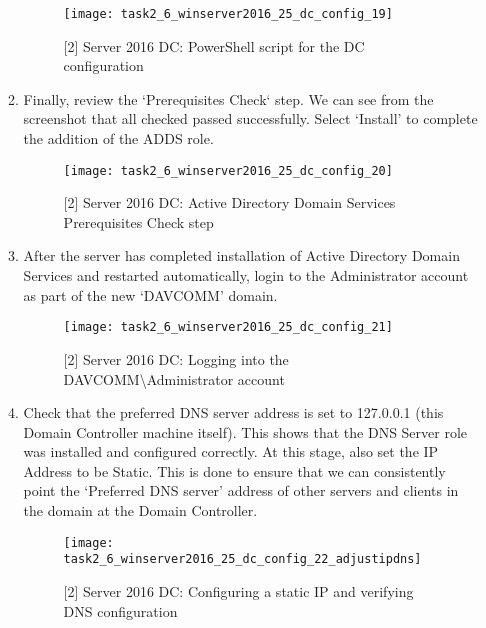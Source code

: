 \begin{enumerate}[series=task2methodology3]
\begin{enumerate}[label=(\alph*)]
        \begin{figure}[H]
          \centering
          \captionsetup{skip=2pt}
          \texttt{[image: task2\_6\_winserver2016\_25\_dc\_config\_19]}
          \caption{[2] Server 2016 DC: PowerShell script for the DC configuration}
          \label{fig:task2:vspherec_windc2_c19}
        \end{figure}
      \item Finally, review the `Prerequisites Check` step. We can see from the screenshot that all checked passed successfully. Select `Install' to complete the addition of the ADDS role.
        \begin{figure}[H]
          \centering
          \captionsetup{skip=2pt}
          \texttt{[image: task2\_6\_winserver2016\_25\_dc\_config\_20]}
          \caption{[2] Server 2016 DC: Active Directory Domain Services Prerequisites Check step}
          \label{fig:task2:vspherec_windc2_c20}
        \end{figure}
      \item After the server has completed installation of Active Directory Domain Services and restarted automatically, login to the Administrator account as part of the new `DAVCOMM' domain.
        \begin{figure}[H]
          \centering
          \captionsetup{skip=2pt}
          \texttt{[image: task2\_6\_winserver2016\_25\_dc\_config\_21]}
          \caption{[2] Server 2016 DC: Logging into the DAVCOMM\textbackslash Administrator account}
          \label{fig:task2:vspherec_windc2_c21}
        \end{figure}
      \item Check that the preferred DNS server address is set to 127.0.0.1 (this Domain Controller machine itself). This shows that the DNS Server role was installed and configured correctly. At this stage, also set the IP Address to be Static. This is done to ensure that we can consistently point the `Preferred DNS server' address of other servers and clients in the domain at the Domain Controller.
        \begin{figure}[H]
          \centering
          \captionsetup{skip=2pt}
          \texttt{[image: task2\_6\_winserver2016\_25\_dc\_config\_22\_adjustipdns]}
          \caption{[2] Server 2016 DC: Configuring a static IP and verifying DNS configuration}
          \label{fig:task2:vspherec_windc2_c22}
        \end{figure}
   \end{enumerate}
\end{enumerate}


